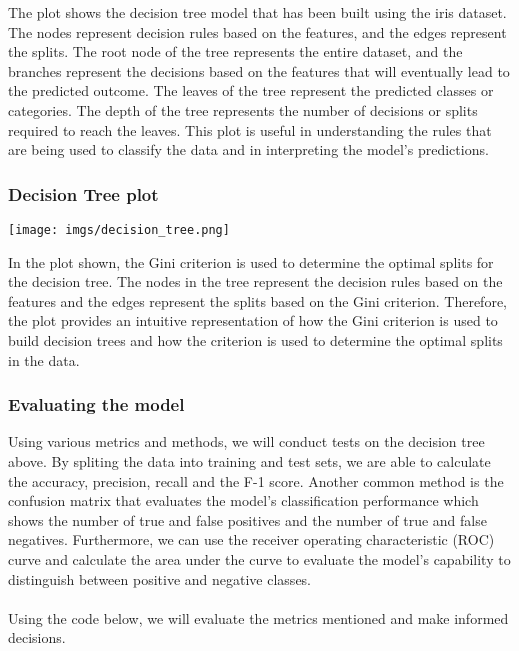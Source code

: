 \documentclass{article}[12pt]
\theoremstyle{definition}
\begin{document}
\bigskip
\bigskip

\noindent
The plot shows the decision tree model that has been built using the iris dataset. The nodes represent decision rules based on the features, and the edges represent the splits. The root node of the tree represents the entire dataset, and the branches represent the decisions based on the features that will eventually lead to the predicted outcome. The leaves of the tree represent the predicted classes or categories. The depth of the tree represents the number of decisions or splits required to reach the leaves. This plot is useful in understanding the rules that are being used to classify the data and in interpreting the model's predictions.

\newpage

\bigskip

\subsubsection{Decision Tree plot}

\begin{center}
    \texttt{[image: imgs/decision\_tree.png]}
\end{center}

\medskip

\noindent
In the plot shown, the Gini criterion is used to determine the optimal splits for the decision tree. The nodes in the tree represent the decision rules based on the features and the edges represent the splits based on the Gini criterion. Therefore, the plot provides an intuitive representation of how the Gini criterion is used to build decision trees and how the criterion is used to determine the optimal splits in the data.


\newpage

\bigskip

\subsubsection{Evaluating the model}

\bigskip

Using various metrics and methods, we will conduct tests on the decision tree above. By spliting the data into training and test sets, we are able to calculate the accuracy, precision, recall and the F-1 score. Another common method is the confusion matrix that evaluates the model's classification performance which shows the number of true and false positives and the number of true and false negatives. Furthermore, we can use the receiver operating characteristic (ROC) curve and calculate the area under the curve to evaluate the model's capability to distinguish between positive and negative classes. 
\\
\\
Using the code below, we will evaluate the metrics mentioned and make informed decisions. 
\end{document}
